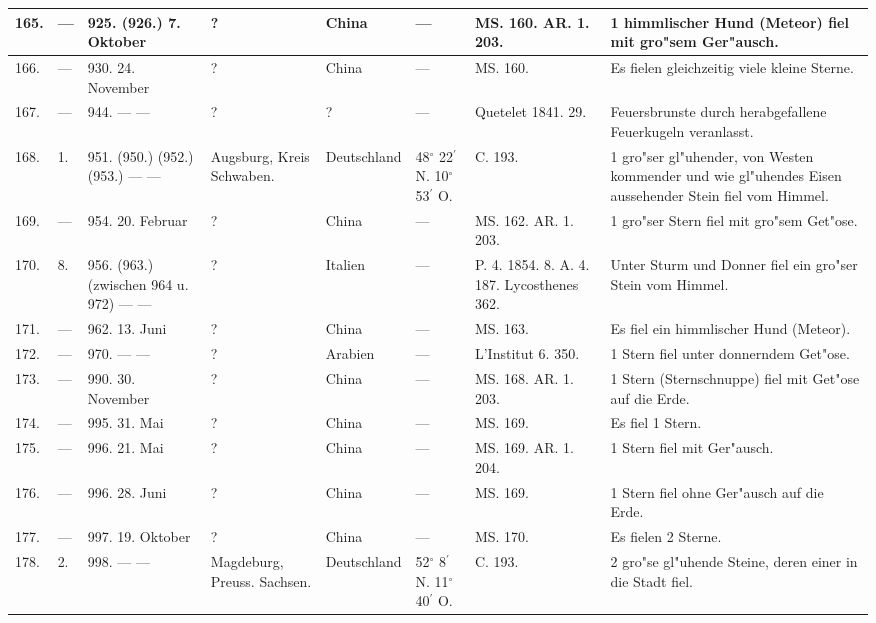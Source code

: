 \documentclass[a4paper, 8pt, oneside, polutonikogreek, german]{article}
\begin{document}
\begin{center}
\begin{longtable}{| p{4mm} | p{2mm} | p{15mm} | p{25mm} | p{16mm} | p{12mm} | p{13mm} | p{20mm} |}
        165. & --- & 925. (926.) 7. Oktober & ? & China & --- & MS. 160. AR. 1. 203. & 1 himmlischer Hund (Meteor) fiel mit gro"sem Ger"ausch. \\ \hline
        166. & --- & 930. 24. November & ? & China & --- & MS. 160. & Es fielen gleichzeitig viele kleine Sterne. \\ \hline
        167. & --- & 944. --- --- & ? & ? & --- & Quetelet 1841. 29. & Feuersbrunste durch herabgefallene Feuerkugeln veranlasst. \\ \hline
        168. & 1. & 951. (950.) (952.) (953.) --- --- & Augsburg, Kreis Schwaben. & Deutschland & 48$^\circ$ 22$^\prime$ N. 10$^\circ$ 53$^\prime$ O. & C. 193. & 1 gro"ser gl"uhender, von Westen kommender und wie gl"uhendes Eisen aussehender Stein fiel vom Himmel. \\ \hline
        169. & --- & 954. 20. Februar & ? & China & --- & MS. 162. AR. 1. 203. & 1 gro"ser Stern fiel mit gro"sem Get"ose. \\ \hline
        170. & 8. & 956. (963.) (zwischen 964 u. 972) --- --- & ? & Italien & --- & P. 4. 1854. 8. A. 4. 187. Lycosthenes 362. & Unter Sturm und Donner fiel ein gro"ser Stein vom Himmel. \\ \hline
        171. & --- & 962. 13. Juni & ? & China & --- & MS. 163. & Es fiel ein himmlischer Hund (Meteor). \\ \hline
        172. & --- & 970. --- --- & ? & Arabien & --- & L’Institut 6. 350. & 1 Stern fiel unter donnerndem Get"ose. \\ \hline
        173. & --- & 990. 30. November & ? & China & --- & MS. 168. AR. 1. 203. & 1 Stern (Sternschnuppe) fiel mit Get"ose auf die Erde. \\ \hline
        174. & --- & 995. 31. Mai & ? & China & --- & MS. 169. & Es fiel 1 Stern. \\ \hline
        175. & --- & 996. 21. Mai & ? & China & --- & MS. 169. AR. 1. 204. & 1 Stern fiel mit Ger"ausch. \\ \hline
        176. & --- & 996. 28. Juni & ? & China & --- & MS. 169. & 1 Stern fiel ohne Ger"ausch auf die Erde. \\ \hline
        177. & --- & 997. 19. Oktober & ? & China & --- & MS. 170. & Es fielen 2 Sterne. \\ \hline
        178. & 2. & 998. --- --- & Magdeburg, Preuss. Sachsen. & Deutschland & 52$^\circ$ 8$^\prime$ N. 11$^\circ$ 40$^\prime$ O. & C. 193. & 2 gro"se gl"uhende Steine, deren einer in die Stadt fiel. \\ \hline

\end{longtable}
\end{center}
\end{document}
